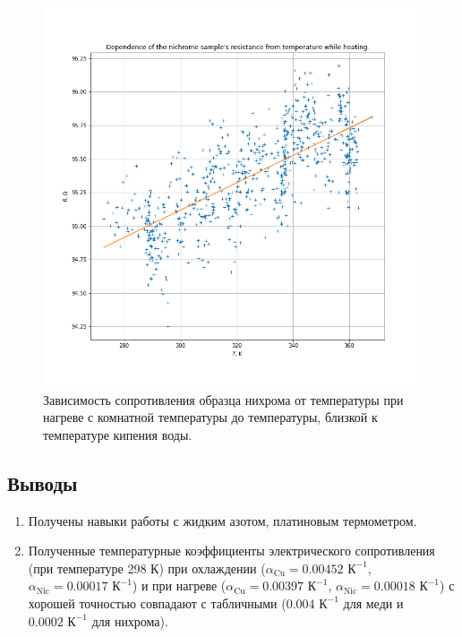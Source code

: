 \documentclass[a4paper, 12pt]{article}
\begin{document}
\begin{figure}[H]
	\centering
	\includegraphics[width=\linewidth]{1_Ni_Heating}
	\caption{Зависимость сопротивления образца нихрома от температуры при нагреве с комнатной температуры до температуры, близкой к температуре кипения воды.}
	\label{fig:1_Ni_Heating}
\end{figure}

\subsection{Выводы}

\begin{enumerate}
	\item Получены навыки работы с жидким азотом, платиновым термометром.
	
	\item Полученные температурные коэффициенты электрического сопротивления (при температуре 298 К) при охлаждении ($\alpha_{\text{Cu}} = 0.00452 \text{ К}^{-1}$, $\alpha_{\text{Nic}} = 0.00017 \text{ К}^{-1}$) и при нагреве ($\alpha_{\text{Cu}} = 0.00397 \text{ К}^{-1}$, $\alpha_{\text{Nic}} = 0.00018 \text{ К}^{-1}$) с хорошей точностью совпадают с табличными ($0.004 \text{ К}^{-1}$ для меди и $0.0002 \text{ К}^{-1}$ для нихрома).
\end{enumerate}
\end{document}
